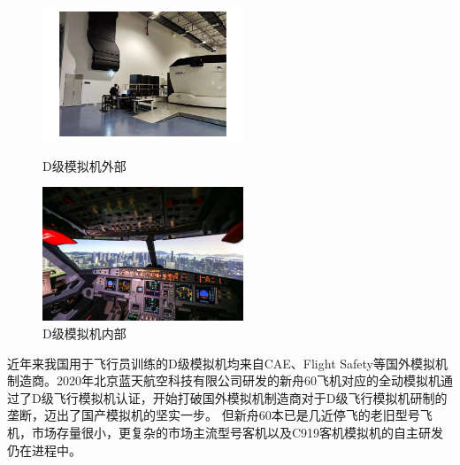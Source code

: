 \begin{figure}[h!]
    \begin{minipage}[t]{0.48\textwidth}
        \centering
        \includegraphics[width=6cm]{pictures/simulator.png}
        \caption{D级模拟机外部}
        \label{simout}
    \end{minipage}
    \begin{minipage}[t]{0.48\textwidth}
        \centering
        \includegraphics[width=6cm]{pictures/simulator.jpg}
        \caption{D级模拟机内部}
        \label{siminn}
    \end{minipage}
\end{figure}
\vspace{12pt}
\par
近年来我国用于飞行员训练的D级模拟机均来自CAE、Flight Safety等国外模拟机制造商。2020年北京蓝天航空科技有限公司研发的新舟60飞机对应的全动模拟机通过了D级飞行模拟机认证，开始打破国外模拟机制造商对于D级飞行模拟机研制的垄断，迈出了国产模拟机的坚实一步\cite{simhis3}。
但新舟60本已是几近停飞的老旧型号飞机，市场存量很小，更复杂的市场主流型号客机以及C919客机模拟机的自主研发仍在进程中。

